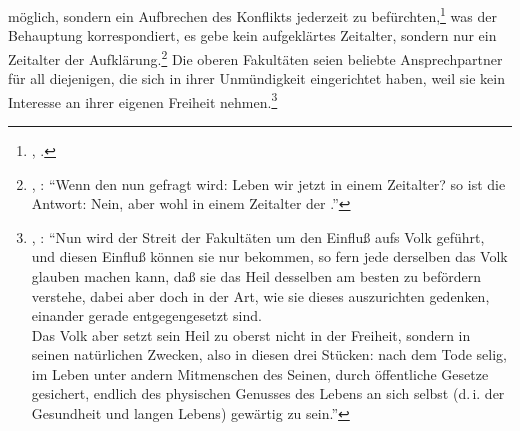 möglich, sondern ein Aufbrechen des Konflikts jederzeit zu
befürchten,\footnote{\cite[Vgl.][A~35-42]{Kant:DerStreitderFakultaeten1977},
\cite[VII: 32.13-35.27]{Kant:GesammelteWerke1900ff.}.} was der Behauptung
korrespondiert, es gebe kein aufgeklärtes Zeitalter, sondern nur ein Zeitalter
der Aufklärung.\footnote{\cite[Vgl.][A
491]{Kant:BeantwortungderFrage:WasistAufklaerung?1977}, \cite[][VIII:
40.17--19]{Kant:GesammelteWerke1900ff.}: \enquote{Wenn den nun gefragt wird:
Leben wir jetzt in einem  Zeitalter? so ist die Antwort: Nein,
aber wohl in einem Zeitalter der .}} Die
oberen Fakultäten seien beliebte Ansprechpartner für all diejenigen, die sich in ihrer Unmündigkeit eingerichtet haben, weil sie kein Interesse an ihrer eigenen Freiheit nehmen.\footnote{\cite[][A~29-30]{Kant:DerStreitderFakultaeten1977}, \cite[VII:
29.34--30.9]{Kant:GesammelteWerke1900ff.}: \enquote{Nun wird der Streit der
Fakultäten um den Einfluß aufs Volk geführt, und diesen Einfluß können sie nur bekommen, so fern jede derselben das Volk glauben machen kann, daß sie das Heil desselben am besten zu befördern verstehe, dabei aber doch in der Art, wie sie dieses auszurichten gedenken,
  einander gerade entgegengesetzt sind.\\
  Das Volk aber setzt sein Heil zu oberst nicht in der Freiheit, sondern in
  seinen natürlichen Zwecken, also in diesen drei Stücken: nach dem Tode selig,
  im Leben unter andern Mitmenschen des Seinen, durch öffentliche Gesetze
  gesichert, endlich des physischen Genusses des Lebens an sich selbst (d.\,i.
  der Gesundheit und langen Lebens) gewärtig zu
  sein.}}

